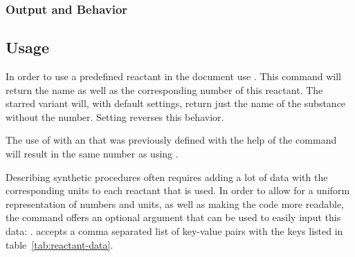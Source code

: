 \documentclass{chemmacros-manual}
\begin{document}
\subsubsection{Output and Behavior}
\begin{options}
  \Default{}
\end{options}

\subsection{Usage}

In order to use a predefined reactant in the document use
.  This command will return the name as well as the
corresponding number of this reactant. The starred variant
\sarg{} will, with default settings, return just the name
of the substance without the number.  Setting  reverses
this behavior.

The use of  with an  that was previously defined
with the help of the  command will result in the same number as
using .

\begin{example}
  \par
\end{example}

Describing synthetic procedures often requires adding a lot of data with the
corresponding units to each reactant that is used. In order to allow for a
uniform representation of numbers and units, as well as making the code more
readable, the  command offers an optional argument that can be
used to easily input this data: .
 accepts a comma separated list of key-value pairs with the
keys listed in table~\vref{tab:reactant-data}.
\end{document}
